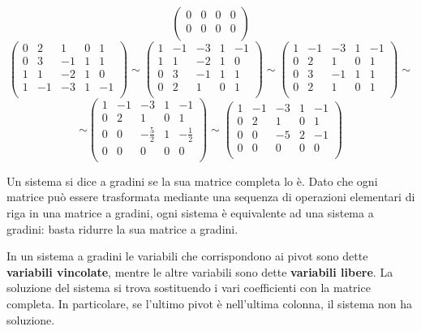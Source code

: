 \begin{example}
$$\begin{pmatrix}
      0 & 0  & 0 & 0  \\
      0 & 0  & 0 & 0  \\
    \end{pmatrix}
  $$
  $$
    \begin{pmatrix}
      0 & 2  & 1  & 0 & 1  \\
      0 & 3  & -1 & 1 & 1  \\
      1 & 1  & -2 & 1 & 0  \\
      1 & -1 & -3 & 1 & -1 \\
    \end{pmatrix}
    \sim
    \begin{pmatrix}
      1 & -1 & -3 & 1 & -1 \\
      1 & 1  & -2 & 1 & 0  \\
      0 & 3  & -1 & 1 & 1  \\
      0 & 2  & 1  & 0 & 1  \\
    \end{pmatrix}
    \sim
    \begin{pmatrix}
      1 & -1 & -3 & 1 & -1 \\
      0 & 2  & 1  & 0 & 1  \\
      0 & 3  & -1 & 1 & 1  \\
      0 & 2  & 1  & 0 & 1  \\
    \end{pmatrix}
    \sim
  $$
  $$
    \sim
    \begin{pmatrix}
      1 & -1 & -3           & 1 & -1           \\
      0 & 2  & 1            & 0 & 1            \\
      0 & 0  & -\frac{5}{2} & 1 & -\frac{1}{2} \\
      0 & 0  & 0            & 0 & 0            \\
    \end{pmatrix}
    \sim
    \begin{pmatrix}
      1 & -1 & -3 & 1 & -1 \\
      0 & 2  & 1  & 0 & 1  \\
      0 & 0  & -5 & 2 & -1 \\
      0 & 0  & 0  & 0 & 0  \\
    \end{pmatrix}
  $$  
\end{example}


Un sistema si dice a gradini se la sua matrice completa lo è. Dato che ogni matrice può essere trasformata mediante una sequenza di operazioni elementari di riga in una matrice a gradini, ogni sistema è equivalente ad una sistema a gradini: basta ridurre la sua matrice a gradini.

In un sistema a gradini le variabili che corrispondono ai pivot sono dette \textbf{variabili vincolate}, mentre le altre variabili sono dette \textbf{variabili libere}.
La soluzione del sistema si trova sostituendo i vari coefficienti con la matrice completa. In particolare, se l'ultimo pivot è nell'ultima colonna, il sistema non ha soluzione.

